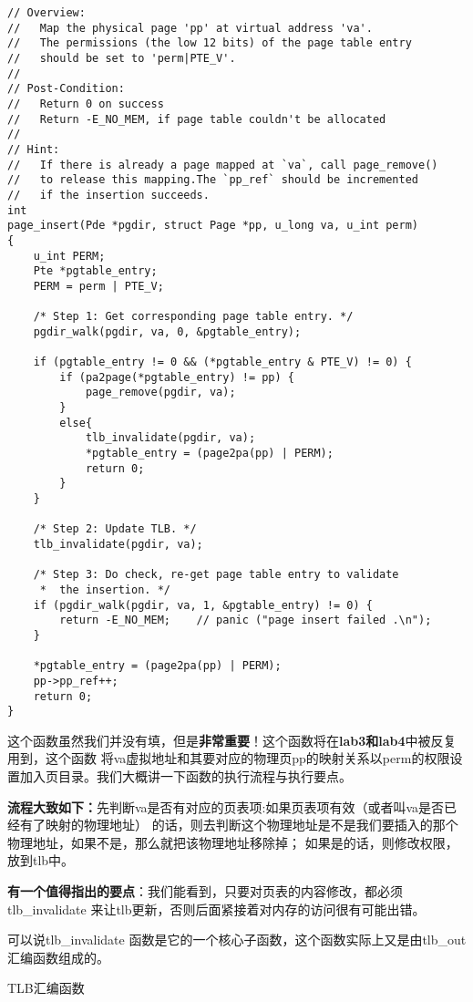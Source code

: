 \begin{verbatim}
// Overview:
//   Map the physical page 'pp' at virtual address 'va'.
//   The permissions (the low 12 bits) of the page table entry
//   should be set to 'perm|PTE_V'.
//
// Post-Condition:
//   Return 0 on success
//   Return -E_NO_MEM, if page table couldn't be allocated
//
// Hint:
//   If there is already a page mapped at `va`, call page_remove()
//   to release this mapping.The `pp_ref` should be incremented
//   if the insertion succeeds.
int
page_insert(Pde *pgdir, struct Page *pp, u_long va, u_int perm)
{
	u_int PERM;
	Pte *pgtable_entry;
	PERM = perm | PTE_V;

	/* Step 1: Get corresponding page table entry. */
	pgdir_walk(pgdir, va, 0, &pgtable_entry);

	if (pgtable_entry != 0 && (*pgtable_entry & PTE_V) != 0) {
		if (pa2page(*pgtable_entry) != pp) {
			page_remove(pgdir, va);
		}
		else{
			tlb_invalidate(pgdir, va);
			*pgtable_entry = (page2pa(pp) | PERM);
			return 0;
		}
	}

	/* Step 2: Update TLB. */
	tlb_invalidate(pgdir, va);

	/* Step 3: Do check, re-get page table entry to validate
	 *  the insertion. */
	if (pgdir_walk(pgdir, va, 1, &pgtable_entry) != 0) {
		return -E_NO_MEM;    // panic ("page insert failed .\n");
	}

	*pgtable_entry = (page2pa(pp) | PERM);
	pp->pp_ref++;
	return 0;
}
\end{verbatim}

这个函数虽然我们并没有填，但是\textbf{非常重要}！这个函数将在\textbf{lab3和lab4}中被反复用到，这个函数
将va虚拟地址和其要对应的物理页pp的映射关系以perm的权限设置加入页目录。我们大概讲一下函数的执行流程与执行要点。

\textbf{流程大致如下：}先判断va是否有对应的页表项:如果页表项有效（或者叫va是否已经有了映射的物理地址）
的话，则去判断这个物理地址是不是我们要插入的那个物理地址，如果不是，那么就把该物理地址移除掉；
如果是的话，则修改权限，放到tlb中。

\textbf{有一个值得指出的要点}：我们能看到，只要对页表的内容修改，都必须tlb\_invalidate 来让tlb更新，否则后面紧接着对内存的访问很有可能出错。

可以说tlb\_invalidate 函数是它的一个核心子函数，这个函数实际上又是由tlb\_out 汇编函数组成的。

\begin{codeBoxWithCaption}{TLB汇编函数\label{code:tlb_out.S}}
  \inputminted[linenos]{gas}{codes/tlb_out.S}
\end{codeBoxWithCaption}

